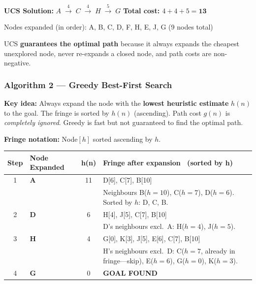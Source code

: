 \documentclass[12pt, a4paper]{article}
\newenvironment{answerbox}{\begin{mdframed}[style=answerframe]}{\end{mdframed}}
\newcommand{\goal}{\textcolor{green!55!black}{\textbf{GOAL FOUND}}}
\begin{document}
\begin{answerbox}
\textbf{UCS Solution:} $A \;\xrightarrow{4}\; C \;\xrightarrow{4}\; H \;\xrightarrow{5}\; G$
\hfill \textbf{Total cost: $4+4+5 = \mathbf{13}$}

Nodes expanded (in order): A, B, C, D, F, H, E, J, G \quad(9 nodes total)

UCS \textbf{guarantees the optimal path} because it always expands the cheapest unexplored node, never re-expands a closed node, and path costs are non-negative.
\end{answerbox}

\vspace{1em}

\subsubsection*{Algorithm 2 — Greedy Best-First Search}

\textbf{Key idea:} Always expand the node with the \textbf{lowest heuristic estimate} $h(n)$ to the goal.
The fringe is sorted by $h(n)$ (ascending). Path cost $g(n)$ is \emph{completely ignored}.
Greedy is fast but not guaranteed to find the optimal path.

\textbf{Fringe notation:} Node$[h]$ sorted ascending by $h$.

\vspace{0.4em}
\begin{center}
\renewcommand{\arraystretch}{1.25}
\begin{tabular}{c|l|c|p{9cm}}
\toprule
\textbf{Step} & \textbf{Node Expanded} & \textbf{h(n)} &
\textbf{Fringe after expansion \ (sorted by h)} \\
\midrule
1 & \textbf{A} & 11
  & D[6], C[7], B[10] \\
  & & & \footnotesize Neighbours B($h{=}10$), C($h{=}7$), D($h{=}6$). Sorted by $h$: D, C, B. \\
\midrule
2 & \textbf{D} & 6
  & H[4], J[5], C[7], B[10] \\
  & & & \footnotesize D's neighbours excl.\ A: H($h{=}4$), J($h{=}5$). \\
\midrule
3 & \textbf{H} & 4
  & G[0], K[3], J[5], E[6], C[7], B[10] \\
  & & & \footnotesize H's neighbours excl.\ D: C($h{=}7$, already in fringe—skip),
         E($h{=}6$), G($h{=}0$), K($h{=}3$). \\
\midrule
4 & \textbf{G} & 0
  & \goal \\
\bottomrule
\end{tabular}
\end{center}
\end{document}
